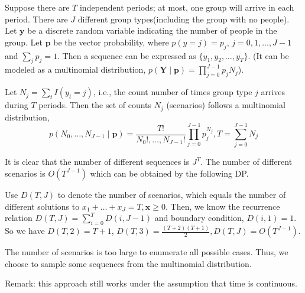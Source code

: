 Suppose there are $T$ independent periods; at most, one group will arrive in each period.
There are $J$ different group types(including the group with no people). Let $\mathbf{y}$ be a discrete random variable indicating the number of people in the group. Let $\mathbf{p}$ be the vector probability, where $p(y = j) = p_j$, $j = 0,1,\ldots,J-1$ and $\sum_{j} p_{j} =1$. Then a sequence can be expressed as $\{y_{1}, y_{2}, \ldots, y_{T}\}$. (It can be modeled as a multinomial distribution, $p(\mathbf{Y} \mid \mathbf{p})=\prod_{j=0}^{J-1} p_j N_j$).

Let $N_{j} = \sum_{t} I(y_t = j)$, i.e., the count number of times group type $j$ arrives during $T$ periods. Then the set of counts $N_{j}$ (scenarios) follows a multinomial distribution, $$p\left(N_0, \ldots, N_{J-1} \mid \mathbf{p}\right)=\frac{T !}{N_{0}!, \ldots, N_{J-1}!} \prod_{j=0}^{J-1} p_{j}^{N_j}, T = \sum_{j=0}^{J-1} N_{j}$$



It is clear that the number of different sequences is $J^{T}$. The number of different scenarios is $O(T^{J-1})$ which can be obtained by the following DP.

Use $D(T,J) $ to denote the number of scenarios, which equals the number of different solutions to $x_{1}+\ldots + x_{J} = T, \mathbf{x} \geq 0$.
Then, we know the recurrence relation $D(T, J) = \sum_{i= 0}^{T} D(i, J-1)$ and boundary condition, $D(i,1) = 1$. So we have $D(T,2) = T+1$, $D(T,3) = \frac{(T+2)(T+1)}{2}, D(T,J) = O(T^{J-1})$.

The number of scenarios is too large to enumerate all possible cases.
Thus, we choose to sample some sequences from the multinomial distribution.

Remark: this approach still works under the assumption that time is continuous.


